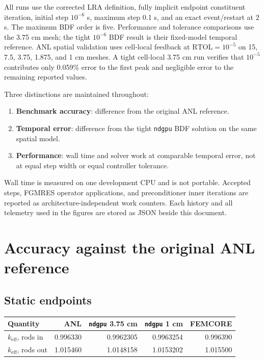 \documentclass[10pt]{article}
\newcommand{\ndgpu}{\texttt{ndgpu}}
\begin{document}
All runs use the corrected LRA definition, fully implicit endpoint constituent
iteration, initial step $10^{-6}$ s, maximum step 0.1 s, and an exact
event/restart at 2 s. The maximum BDF order is five. Performance and tolerance
comparisons use the 3.75 cm mesh; the tight $10^{-6}$ BDF result is their
fixed-model temporal reference. ANL spatial validation uses cell-local feedback
at $\mathrm{RTOL}=10^{-5}$ on 15, 7.5, 3.75, 1.875, and 1 cm meshes. A tight
cell-local 3.75 cm run verifies that $10^{-5}$ contributes only 0.059\% error
to the first peak and negligible error to the remaining reported values.

Three distinctions are maintained throughout:
\begin{enumerate}
\item \textbf{Benchmark accuracy}: difference from the original ANL reference.
\item \textbf{Temporal error}: difference from the tight \ndgpu{} BDF solution
  on the same spatial model.
\item \textbf{Performance}: wall time and solver work at comparable temporal
  error, not at equal step width or equal controller tolerance.
\end{enumerate}

Wall time is measured on one development CPU and is not portable. Accepted
steps, FGMRES operator applications, and preconditioner inner iterations are
reported as architecture-independent work counters. Each history and all
telemetry used in the figures are stored as JSON beside this document.

\section{Accuracy against the original ANL reference}

\subsection{Static endpoints}

\begin{center}
\begin{tabular}{|l|r|r|r|r|}
\hline
Quantity & ANL & \ndgpu{} 3.75 cm & \ndgpu{} 1 cm & FEMCORE \\
\hline
$k_{\mathrm{eff}}$, rods in  & 0.996330 & 0.9962305 & 0.9963254 & 0.996390 \\
$k_{\mathrm{eff}}$, rods out & 1.015460 & 1.0148158 & 1.0153202 & 1.015500 \\
\hline
\end{tabular}
\end{center}
\end{document}

